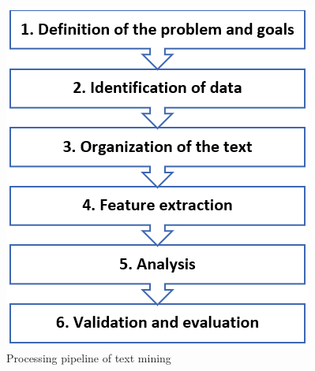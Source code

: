 \documentclass[article,type=msc,colorback,accentcolor=tud7b]{tudthesis}
\begin{document}
    \begin{figure}[H]
      \centering
      \includegraphics{images/text_mining_pipeline}
      \caption{Processing pipeline of text mining}
      \label{fig:text_mining_pipeline}
    \end{figure}
  
\end{document}
